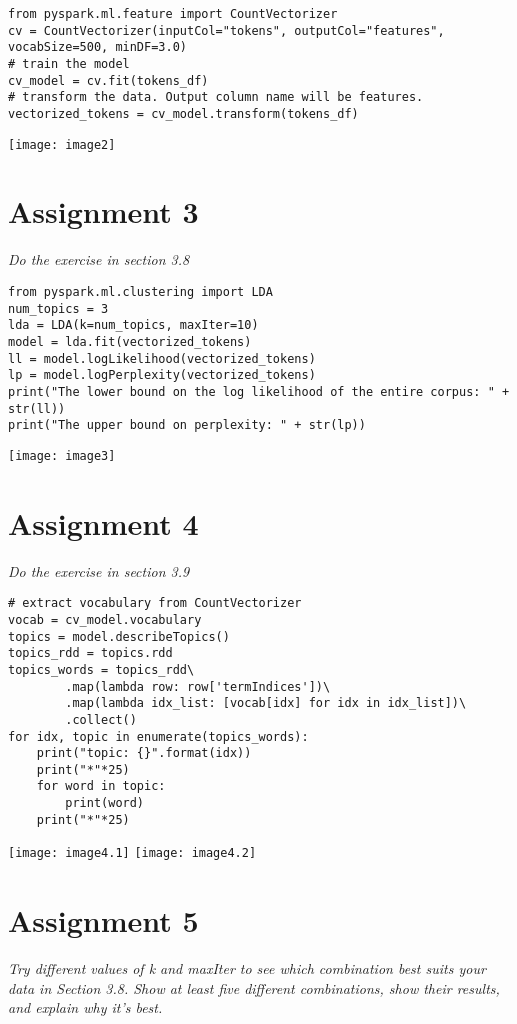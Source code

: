 \documentclass[]{article}
\begin{document}
\begin{verbatim}
from pyspark.ml.feature import CountVectorizer
cv = CountVectorizer(inputCol="tokens", outputCol="features", 
vocabSize=500, minDF=3.0)
# train the model
cv_model = cv.fit(tokens_df)
# transform the data. Output column name will be features.
vectorized_tokens = cv_model.transform(tokens_df)
\end{verbatim}
\texttt{[image: image2]} 


\section*{Assignment 3}
\emph{ Do the exercise in section 3.8 }

\begin{verbatim}
from pyspark.ml.clustering import LDA
num_topics = 3
lda = LDA(k=num_topics, maxIter=10)
model = lda.fit(vectorized_tokens)
ll = model.logLikelihood(vectorized_tokens)
lp = model.logPerplexity(vectorized_tokens)
print("The lower bound on the log likelihood of the entire corpus: " +  str(ll))
print("The upper bound on perplexity: " + str(lp))
\end{verbatim}
\texttt{[image: image3]} 


\section*{Assignment 4}
\emph{ Do the exercise in section 3.9 }

\begin{verbatim}
# extract vocabulary from CountVectorizer
vocab = cv_model.vocabulary
topics = model.describeTopics() 
topics_rdd = topics.rdd
topics_words = topics_rdd\
		.map(lambda row: row['termIndices'])\
		.map(lambda idx_list: [vocab[idx] for idx in idx_list])\
		.collect()
for idx, topic in enumerate(topics_words):
	print("topic: {}".format(idx))
	print("*"*25)
	for word in topic:
		print(word)
	print("*"*25)
\end{verbatim}
\texttt{[image: image4.1]} %
\texttt{[image: image4.2]} %


\section*{Assignment 5}
\emph{ Try different values of k and maxIter to see which combination best suits your data in Section 3.8. Show at least five different combinations, show their results, and explain why it’s best.
}
\end{document}
